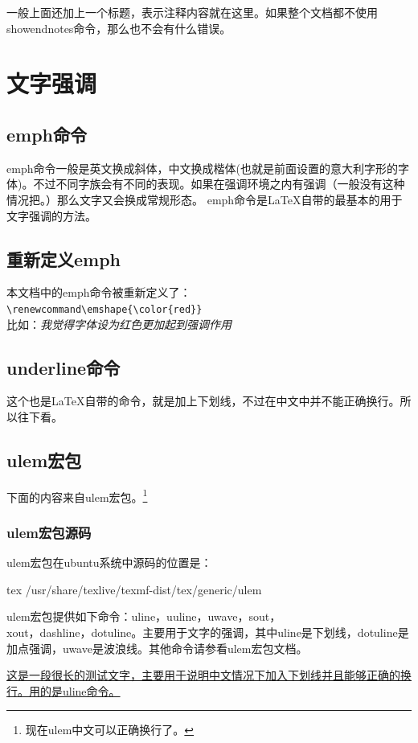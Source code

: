 \documentclass[11pt,oneside]{book}
\begin{document}
一般上面还加上一个标题，表示注释内容就在这里。如果整个文档都不使用showendnotes命令，那么也不会有什么错误。


\chapter{文字强调}
\section{emph命令}
emph命令一般是英文换成斜体，中文换成楷体(也就是前面设置的意大利字形的字体)。不过不同字族会有不同的表现。如果在强调环境之内有强调（一般没有这种情况把。）那么文字又会换成常规形态。
emph命令是\LaTeX 自带的最基本的用于文字强调的方法。


\section{重新定义emph}
\label{sec:emph}
本文档中的emph命令被重新定义了：\\
\verb+\renewcommand\emshape{\color{red}}+\\
比如：\emph{我觉得字体设为红色更加起到强调作用}

\section{underline命令}
这个也是\LaTeX 自带的命令，就是加上下划线，不过在中文中并不能正确换行。所以往下看。

\section{ulem宏包}
下面的内容来自ulem宏包。\footnote{现在ulem中文可以正确换行了。}

\subsection{ulem宏包源码}
ulem宏包在ubuntu系统中源码的位置是：
\begin{tcbcode}[]{tex}
/usr/share/texlive/texmf-dist/tex/generic/ulem
\end{tcbcode}

ulem宏包提供如下命令：uline，uuline，uwave，sout，\\ xout，dashline，dotuline。主要用于文字的强调，其中uline是下划线，dotuline是加点强调，uwave是波浪线。其他命令请参看ulem宏包文档。

\uline{这是一段很长的测试文字，主要用于说明中文情况下加入下划线并且能够正确的换行。用的是uline命令。}
\end{document}
